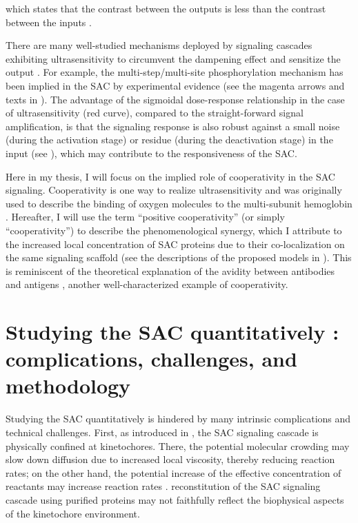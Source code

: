 \noindent which states that the contrast between the outputs is less than the contrast between the inputs \cite{InhibitorUltrasensitivity}.

There are many well-studied mechanisms deployed by signaling cascades exhibiting ultrasensitivity to circumvent the dampening effect and sensitize the output \cite{ZeroOrder, MultistepUltrasensitivity, Bistability}. For example, the multi-step/multi-site phosphorylation mechanism has been implied in the SAC by experimental evidence \cite{Ji2017eLife} (see the magenta arrows and texts in ). The advantage of the sigmoidal dose-response relationship in the case of ultrasensitivity (red curve), compared to the straight-forward signal amplification, is that the signaling response is also robust against a small noise (during the activation stage) or residue (during the deactivation stage) in the input (see ), which may contribute to the responsiveness of the SAC.

Here in my thesis, I will focus on the implied role of cooperativity in the SAC signaling. Cooperativity is one way to realize ultrasensitivity and was originally used to describe the binding of oxygen molecules to the multi-subunit hemoglobin \cite{KNF, MWC}. Hereafter, I will use the term ``positive cooperativity'' (or simply ``cooperativity'') to describe the phenomenological synergy, which I attribute to the increased local concentration of SAC proteins due to their co-localization on the same signaling scaffold (see the descriptions of the proposed models in ). This is reminiscent of the theoretical explanation of the avidity between antibodies and antigens \cite{AvidityMath}, another well-characterized example of cooperativity.

\section{Studying the SAC quantitatively : complications, challenges, and methodology}
\label{TechnicalChallenges}

Studying the SAC quantitatively  is hindered by many intrinsic complications and technical challenges. First, as introduced in , the SAC signaling cascade is physically confined at kinetochores. There, the potential molecular crowding may slow down diffusion due to increased local viscosity, thereby reducing reaction rates; on the other hand, the potential increase of the effective concentration of reactants may increase reaction rates \cite{MolecularCrowding}.  reconstitution of the SAC signaling cascade using purified proteins may not faithfully reflect the biophysical aspects of the kinetochore environment.

